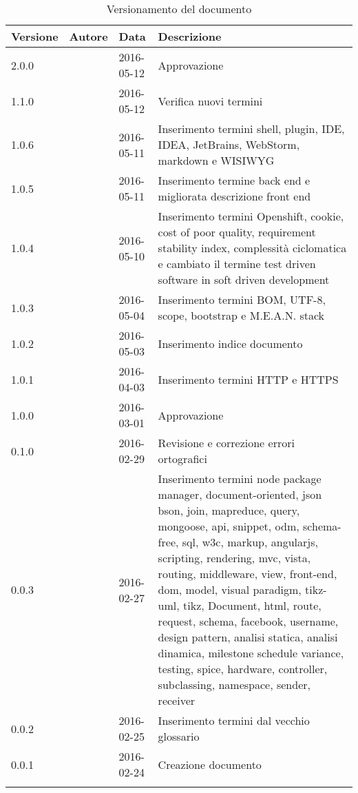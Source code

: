 \documentclass[12pt,a4paper]{article}
\begin{document}
\begin{center}
	\begin{longtable}[H]{p{} p{} p{} p{}}
		\toprule
		\textbf{Versione}	&	\textbf{Autore}	&	\textbf{Data}	&	\textbf{Descrizione}\\*
		\midrule
		\midrule
		2.0.0 & \WS & 2016-05-12 & Approvazione \\*
		\midrule
		1.1.0 & \NDC & 2016-05-12 & Verifica nuovi termini \\*
		\midrule
		1.0.6 & \WS & 2016-05-11  & Inserimento termini shell, plugin, IDE, IDEA, JetBrains, WebStorm, markdown e WISIWYG\\*
		1.0.5 & \TP{} & 2016-05-11 & Inserimento termine back end e migliorata descrizione front end \\*
		\midrule
		1.0.4 & \WS & 2016-05-10 & Inserimento termini Openshift, cookie, cost of poor quality, requirement stability index, complessità ciclomatica e cambiato il termine test driven software in soft driven development\\*
		\midrule
		1.0.3 & \WS & 2016-05-04  & Inserimento termini BOM, UTF-8, scope, bootstrap e M.E.A.N. stack \\*
		\midrule
		1.0.2 & \WS & 2016-05-03  & Inserimento indice documento \\*
		\midrule
		1.0.1 & \TP & 2016-04-03  & Inserimento termini HTTP e HTTPS \\*
		\midrule
		1.0.0 & \TP & 2016-03-01  & Approvazione \\*
		\midrule
		0.1.0 & \NDC & 2016-02-29 & Revisione e correzione errori ortografici \\*
		\midrule
		0.0.3 & \AB & 2016-02-27  & Inserimento termini node package manager, document-oriented, json
		bson, join, mapreduce, query, mongoose, api, snippet, odm, schema-free, sql, w3c, markup, angularjs, scripting, rendering, mvc,  vista, routing, middleware, view, front-end, dom, model, visual paradigm, tikz-uml, tikz, Document, html, route, request, schema, facebook, username, design pattern, analisi statica, analisi dinamica, milestone schedule variance,  testing, spice, hardware, controller, subclassing, namespace, sender, receiver \\*
		\midrule
		0.0.2 & \WS & 2016-02-25  & Inserimento termini dal vecchio glossario \\*
		\midrule
		0.0.1 & \WS & 2016-02-24  & Creazione documento \\*
		\bottomrule
		\caption{Versionamento del documento}
		\label{tabVers1}
	\end{longtable}
\end{center}
\end{document}
